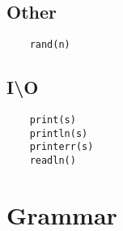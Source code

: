 \subsection{Other}
\begin{verbatim}
    rand(n)
\end{verbatim}

\subsection{I\textbackslash O}
\begin{verbatim}
    print(s)
    println(s)
    printerr(s)
    readln()
\end{verbatim}


\section{Grammar}
